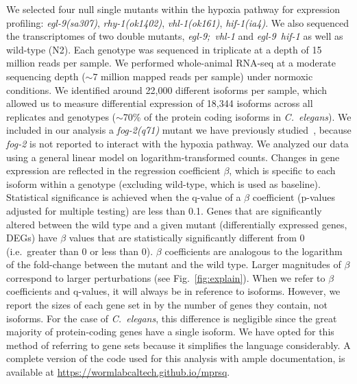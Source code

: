 \documentclass[9pt,twocolumn,twoside]{pnas-new}
\newcommand{\cel}{\emph{C.~elegans}}
\newcommand{\gene}[1]{\mbox{\emph{#1}}}
\begin{document}
We selected four null single mutants within the hypoxia pathway for expression
profiling: \gene{egl-9(sa307)}, \gene{rhy-1(ok1402)}, \gene{vhl-1(ok161)},
\gene{hif-1(ia4)}. We also sequenced the transcriptomes of two double mutants,
\gene{egl-9; vhl-1} and \gene{egl-9 hif-1} as well as wild-type (N2). Each
genotype  was sequenced in triplicate at a depth of 15 million reads per sample.
We performed whole-animal RNA-seq at a moderate sequencing depth ($\sim7$
million mapped reads per sample) under normoxic conditions. We identified around
22,000 different isoforms per sample, which allowed us to measure differential
expression of 18,344 isoforms across all replicates and genotypes ($\sim$70\% of
the protein coding isoforms in \cel{}). We included in our analysis a
\gene{fog-2(q71)} mutant we have previously studied~\cite{Angeles-Albores2016a},
because \gene{fog-2} is not reported to interact with the hypoxia pathway. We
analyzed our data using a general linear model on logarithm-transformed counts.
Changes in gene expression are reflected in the regression coefficient $\beta$,
which is specific to each isoform within a genotype (excluding wild-type, which
is used as baseline). Statistical significance is achieved when the q-value of a
$\beta$ coefficient (p-values adjusted for multiple testing) are less than 0.1.
Genes that are significantly altered between the wild type and a given mutant
(differentially expressed genes, DEGs) have $\beta$ values that are
statistically significantly different from 0 (i.e.\ greater than 0 or less than
0). $\beta$ coefficients are analogous to the logarithm of the fold-change
between the mutant and the wild type. Larger magnitudes of $\beta$ correspond to
larger perturbations (see Fig.~\ref{fig:explain}). When we refer to $\beta$
coefficients and q-values, it will always be in reference to isoforms. However,
we report the sizes of each gene set in by the number of genes they contain, not
isoforms. For the case of \cel{}, this difference is negligible since the great
majority of protein-coding genes have a single isoform. We have opted for this
method of referring to gene sets because it simplifies the language
considerably. A complete version of the code used for this analysis with ample
documentation, is available at \url{https://wormlabcaltech.github.io/mprsq}.
\end{document}
